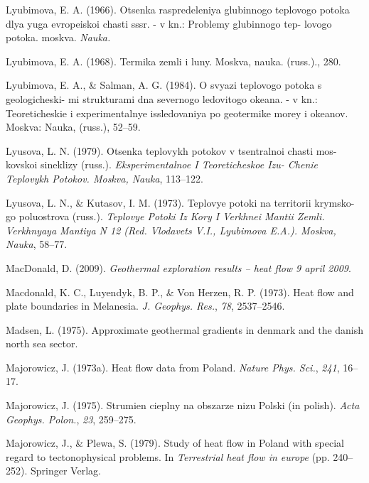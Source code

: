 \begin{CSLReferences}{1}{1}
\leavevmode{}%
Lyubimova, E. A. (1966). Otsenka raspredeleniya glubinnogo teplovogo potoka dlya yuga evropeiskoi chasti sssr. - v kn.: Problemy glubinnogo tep- lovogo potoka. moskva. \emph{Nauka.}

\leavevmode{}%
Lyubimova, E. A. (1968). Termika zemli i luny. Moskva, nauka. (russ.)., 280.

\leavevmode{}%
Lyubimova, E. A., \& Salman, A. G. (1984). O svyazi teplovogo potoka s geologicheski- mi strukturami dna severnogo ledovitogo okeana. - v kn.: Teoreticheskie i experimentalnye issledovaniya po geotermike morey i okeanov. Moskva: Nauka, (russ.), 52--59.

\leavevmode{}%
Lyusova, L. N. (1979). Otsenka teplovykh potokov v tsentralnoi chasti mos- kovskoi sineklizy (russ.). \emph{Eksperimentalnoe I Teoreticheskoe Izu- Chenie Teplovykh Potokov. Moskva, Nauka}, 113--122.

\leavevmode{}%
Lyusova, L. N., \& Kutasov, I. M. (1973). Teplovye potoki na territorii krymsko- go poluostrova (russ.). \emph{Teplovye Potoki Iz Kory I Verkhnei Mantii Zemli. Verkhnyaya Mantiya N 12 (Red. Vlodavets V.I., Lyubimova E.A.). Moskva, Nauka}, 58--77.

\leavevmode{}%
MacDonald, D. (2009). \emph{Geothermal exploration results -- heat flow 9 april 2009}.

\leavevmode{}%
Macdonald, K. C., Luyendyk, B. P., \& Von Herzen, R. P. (1973). Heat flow and plate boundaries in {Melanesia}. \emph{J. Geophys. Res.}, \emph{78}, 2537--2546.

\leavevmode{}%
Madsen, L. (1975). Approximate geothermal gradients in denmark and the danish north sea sector.

\leavevmode{}%
Majorowicz, J. (1973a). Heat flow data from {Poland}. \emph{Nature Phys. Sci.}, \emph{241}, 16--17.

\leavevmode{}%
Majorowicz, J. (1975). Strumien cieplny na obszarze nizu {Polski} (in polish). \emph{Acta Geophys. Polon.}, \emph{23}, 259--275.

\leavevmode{}%
Majorowicz, J., \& Plewa, S. (1979). Study of heat flow in {Poland} with special regard to tectonophysical problems. In \emph{Terrestrial heat flow in europe} (pp. 240--252). Springer Verlag.


\end{CSLReferences}
